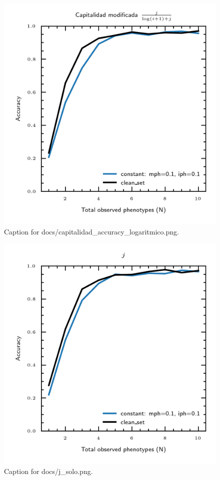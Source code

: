 \documentclass{article}
\begin{document}
\begin{figure}[h] \centering \includegraphics{docs/capitalidad_accuracy_logaritmico.png} \caption{Caption for docs/capitalidad_accuracy_logaritmico.png.} \end{figure}
\begin{figure}[h] \centering \includegraphics{docs/j_solo.png} \caption{Caption for docs/j_solo.png.} \end{figure}
\end{document}
